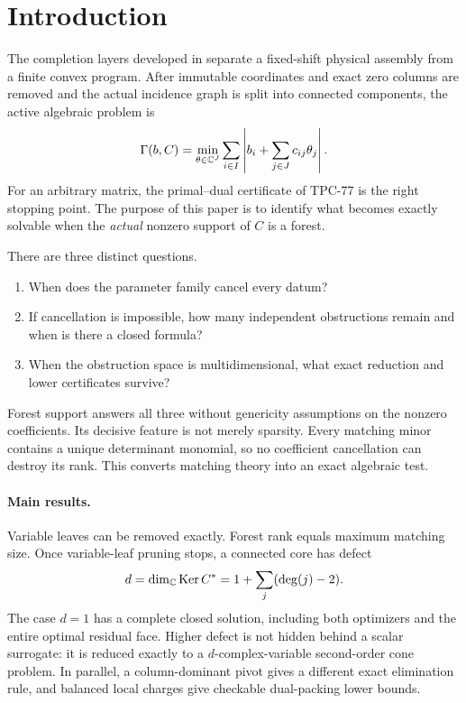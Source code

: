 \section{Introduction}

The completion layers developed in
\cite{WangTPC75,WangTPC77} separate a fixed-shift physical assembly from
a finite convex program.  After immutable coordinates and exact zero
columns are removed and the actual incidence graph is split into
connected components, the active algebraic problem is
\begin{equation}\label{eq:intro-program}
 \Gamma(b,C)
 =
 \min_{\theta\in\mathbb C^J}
 \sum_{i\in I}
 \left|b_i+\sum_{j\in J}c_{ij}\theta_j\right|.
\end{equation}
For an arbitrary matrix, the primal--dual certificate of TPC-77 is the
right stopping point.  The purpose of this paper is to identify what
becomes exactly solvable when the \emph{actual} nonzero support of \(C\)
is a forest.

There are three distinct questions.
\begin{enumerate}[label=(Q\arabic*),leftmargin=2.7em]
\item When does the parameter family cancel every datum?
\item If cancellation is impossible, how many independent obstructions
remain and when is there a closed formula?
\item When the obstruction space is multidimensional, what exact
reduction and lower certificates survive?
\end{enumerate}
Forest support answers all three without genericity assumptions on the
nonzero coefficients.  Its decisive feature is not merely sparsity.
Every matching minor contains a unique determinant monomial, so no
coefficient cancellation can destroy its rank.  This converts matching
theory \cite{LovaszPlummer1986,Schrijver2003} into an exact algebraic
test.

\paragraph{Main results.}
Variable leaves can be removed exactly.  Forest rank equals maximum
matching size.  Once variable-leaf pruning stops, a connected core has
defect
\[
 d=\dim_{\mathbb C}\operatorname{Ker} C^*
   =1+\sum_{j}(\deg(j)-2).
\]
The case \(d=1\) has a complete closed solution, including both
optimizers and the entire optimal residual face.  Higher defect is not
hidden behind a scalar surrogate: it is reduced exactly to a
\(d\)-complex-variable second-order cone problem.  In parallel, a
column-dominant pivot gives a different exact elimination rule, and
balanced local charges give checkable dual-packing lower bounds.

